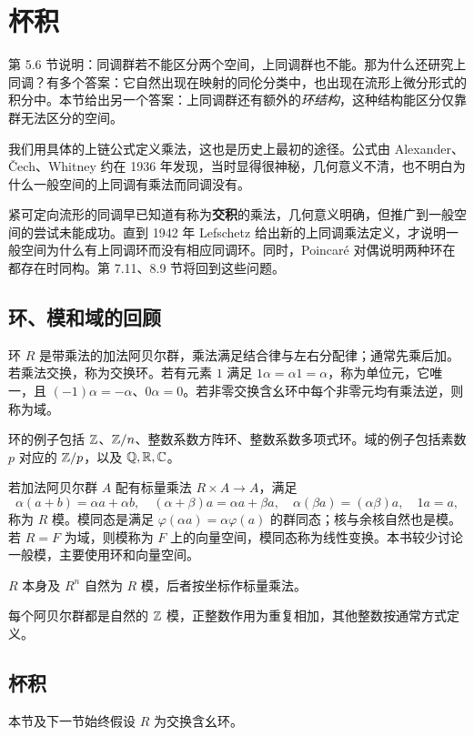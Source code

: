 \section{杯积}
第 5.6 节说明：同调群若不能区分两个空间，上同调群也不能。那为什么还研究上同调？有多个答案：它自然出现在映射的同伦分类中，也出现在流形上微分形式的积分中。本节给出另一个答案：上同调群还有额外的\emph{环结构}，这种结构能区分仅靠群无法区分的空间。

我们用具体的上链公式定义乘法，这也是历史上最初的途径。公式由 Alexander、\v Cech、Whitney 约在 1936 年发现，当时显得很神秘，几何意义不清，也不明白为什么一般空间的上同调有乘法而同调没有。

紧可定向流形的同调早已知道有称为\textbf{交积}的乘法，几何意义明确，但推广到一般空间的尝试未能成功。直到 1942 年 Lefschetz 给出新的上同调乘法定义，才说明一般空间为什么有上同调环而没有相应同调环。同时，Poincar\'e 对偶说明两种环在都存在时同构。第 7.11、8.9 节将回到这些问题。

\subsection*{环、模和域的回顾}
环 $R$ 是带乘法的加法阿贝尔群，乘法满足结合律与左右分配律；通常先乘后加。若乘法交换，称为交换环。若有元素 $1$ 满足 $1\alpha=\alpha1=\alpha$，称为单位元，它唯一，且 $(-1)\alpha=-\alpha$、$0\alpha=0$。若非零交换含幺环中每个非零元均有乘法逆，则称为域。

环的例子包括 $\mathbb{Z}$、$\mathbb{Z}/n$、整数系数方阵环、整数系数多项式环。域的例子包括素数 $p$ 对应的 $\mathbb{Z}/p$，以及 $\mathbb Q,\mathbb{R},\mathbb C$。

若加法阿贝尔群 $A$ 配有标量乘法 $R\times A\to A$，满足
\[
\alpha(a+b)=\alpha a+\alpha b,\quad(\alpha+\beta)a=\alpha a+\beta a,\quad
\alpha(\beta a)=(\alpha\beta)a,\quad1a=a,
\]
称为 $R$ 模。模同态是满足 $\varphi(\alpha a)=\alpha\varphi(a)$ 的群同态；核与余核自然也是模。若 $R=F$ 为域，则模称为 $F$ 上的向量空间，模同态称为线性变换。本书较少讨论一般模，主要使用环和向量空间。

$R$ 本身及 $R^n$ 自然为 $R$ 模，后者按坐标作标量乘法。

每个阿贝尔群都是自然的 $\mathbb{Z}$ 模，正整数作用为重复相加，其他整数按通常方式定义。

\subsection*{杯积}
本节及下一节始终假设 $R$ 为交换含幺环。

